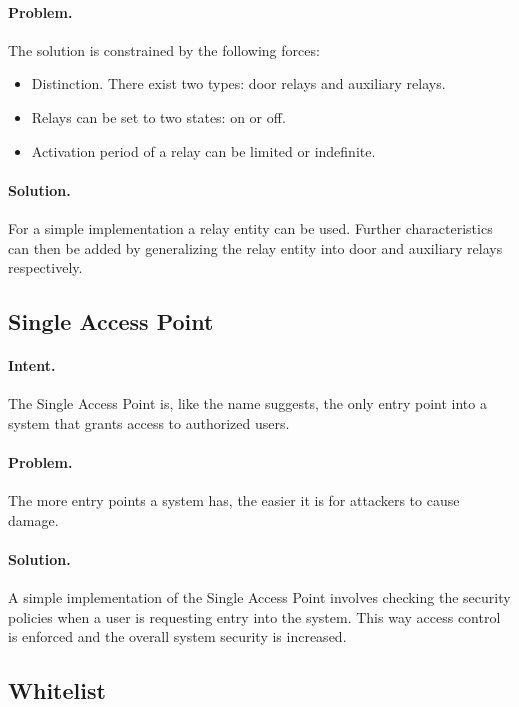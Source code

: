 \paragraph{\textbf{Problem.}} The solution is constrained by the following forces:
\begin{itemize}
	\item Distinction. There exist two types: door relays and auxiliary relays.
	\item Relays can be set to two states: on or off.
	\item Activation period of a relay can be limited or indefinite.
\end{itemize}

\paragraph{\textbf{Solution.}} For a simple implementation a relay entity can be used. Further characteristics can then be added by generalizing the relay entity into door and auxiliary relays respectively. 


\subsection{Single Access Point~\cite{Papoutsakis2021}} 
\label{p:sap}

\paragraph{\textbf{Intent.}} The Single Access Point is, like the name suggests, the only entry point into a system that grants access to authorized users.

\paragraph{\textbf{Problem.}} The more entry points a system has, the easier it is for attackers to cause damage. 

\paragraph{\textbf{Solution.}} A simple implementation of the Single Access Point involves checking the security policies when a user is requesting entry into the system. This way access control is enforced and the overall system security is increased. 


\subsection{Whitelist~\cite{Reinfurt20172}} 
\label{p:white}

